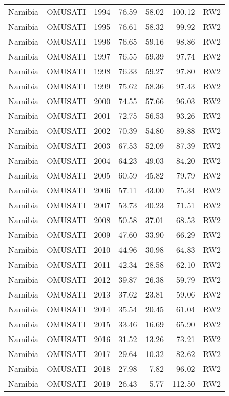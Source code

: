 \begin{longtable}{lllrrrl}
  Namibia & OMUSATI & 1994 & 76.59 & 58.02 & 100.12 & RW2 \\ 
  Namibia & OMUSATI & 1995 & 76.61 & 58.32 & 99.92 & RW2 \\ 
  Namibia & OMUSATI & 1996 & 76.65 & 59.16 & 98.86 & RW2 \\ 
  Namibia & OMUSATI & 1997 & 76.55 & 59.39 & 97.74 & RW2 \\ 
  Namibia & OMUSATI & 1998 & 76.33 & 59.27 & 97.80 & RW2 \\ 
  Namibia & OMUSATI & 1999 & 75.62 & 58.36 & 97.43 & RW2 \\ 
  Namibia & OMUSATI & 2000 & 74.55 & 57.66 & 96.03 & RW2 \\ 
  Namibia & OMUSATI & 2001 & 72.75 & 56.53 & 93.26 & RW2 \\ 
  Namibia & OMUSATI & 2002 & 70.39 & 54.80 & 89.88 & RW2 \\ 
  Namibia & OMUSATI & 2003 & 67.53 & 52.09 & 87.39 & RW2 \\ 
  Namibia & OMUSATI & 2004 & 64.23 & 49.03 & 84.20 & RW2 \\ 
  Namibia & OMUSATI & 2005 & 60.59 & 45.82 & 79.79 & RW2 \\ 
  Namibia & OMUSATI & 2006 & 57.11 & 43.00 & 75.34 & RW2 \\ 
  Namibia & OMUSATI & 2007 & 53.73 & 40.23 & 71.51 & RW2 \\ 
  Namibia & OMUSATI & 2008 & 50.58 & 37.01 & 68.53 & RW2 \\ 
  Namibia & OMUSATI & 2009 & 47.60 & 33.90 & 66.29 & RW2 \\ 
  Namibia & OMUSATI & 2010 & 44.96 & 30.98 & 64.83 & RW2 \\ 
  Namibia & OMUSATI & 2011 & 42.34 & 28.58 & 62.10 & RW2 \\ 
  Namibia & OMUSATI & 2012 & 39.87 & 26.38 & 59.79 & RW2 \\ 
  Namibia & OMUSATI & 2013 & 37.62 & 23.81 & 59.06 & RW2 \\ 
  Namibia & OMUSATI & 2014 & 35.54 & 20.45 & 61.04 & RW2 \\ 
  Namibia & OMUSATI & 2015 & 33.46 & 16.69 & 65.90 & RW2 \\ 
  Namibia & OMUSATI & 2016 & 31.52 & 13.26 & 73.21 & RW2 \\ 
  Namibia & OMUSATI & 2017 & 29.64 & 10.32 & 82.62 & RW2 \\ 
  Namibia & OMUSATI & 2018 & 27.98 & 7.82 & 96.02 & RW2 \\ 
  Namibia & OMUSATI & 2019 & 26.43 & 5.77 & 112.50 & RW2 \\ 

\end{longtable}
